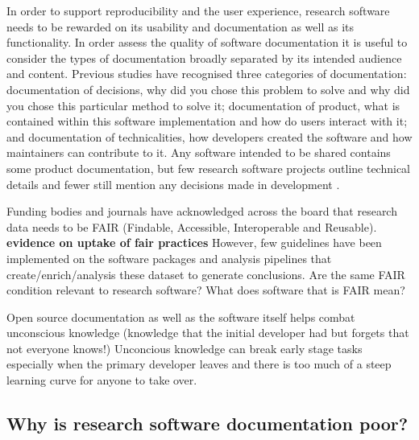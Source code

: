 \documentclass{SBCbookchapter}
\begin{document}
In order to support reproducibility and the user experience, research software needs to be rewarded on its usability and documentation as well as its functionality.
In order assess the quality of software documentation it is useful to consider the types of documentation broadly separated by its intended audience and content. 
Previous studies have recognised three categories of documentation: documentation of decisions, why did you chose this problem to solve and why did you chose this particular method to solve it; documentation of product, what is contained within this software implementation and how do users interact with it; and documentation of technicalities, how developers created the software and how maintainers can contribute to it. 
Any software intended to be shared contains some product documentation, but few research software projects outline technical details and fewer still mention any decisions made in development \cite{Geiger2018}.

Funding bodies and journals have acknowledged across the board that research data needs to be FAIR (Findable, Accessible, Interoperable and Reusable). \textbf{evidence on uptake of fair practices} However, few guidelines have been implemented on the software packages and analysis pipelines that create/enrich/analysis these dataset to generate conclusions. Are the same FAIR condition relevant to research software? What does software that is FAIR mean? %


Open source documentation as well as the software itself helps combat unconscious knowledge (knowledge that the initial developer had but forgets that not everyone knows!) Unconcious knowledge can break early stage tasks especially when the primary developer leaves and there is too much of a steep learning curve for anyone to take over.  


\subsection{Why is research software documentation poor?}
\end{document}
